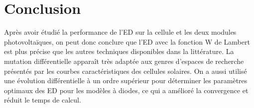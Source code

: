 \section{Conclusion}
Après avoir étudié la performance de l'ED sur la cellule et les deux modules photovoltaïques, on peut donc conclure que l'ED avec la fonction W de Lambert est plus précise que les autres techniques disponibles dans la littérature. La mutation différentielle apparaît très adaptée aux genres d'espaces de recherche présentés par les courbes caractéristiques des cellules solaires. On a aussi utilisé une évolution différentielle à un ordre supérieur pour déterminer les paramètres optimaux des ED pour les modèles à diodes, ce qui a amélioré la convergence et réduit le temps de calcul.
